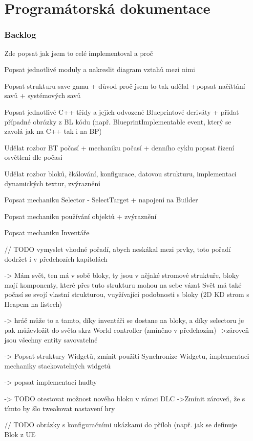 
\chapter{Programátorská dokumentace}







\subsection{Backlog}

Zde popsat jak jsem to celé implementoval a proč

Popsat jednotlivé moduly a nakreslit diagram vztahů mezi nimi

Popsat strukturu save gamu + důvod proč jsem to tak udělal
+popsat načíttání savů + systémových savů


Popsat jednotlivé C++ třídy a jejich odvozené Blueprintové deriváty + přidat případné obrázky z BL kódu (např. BlueprintImplementable event, který se zavolá jak na C++ tak i na BP) 

Udělat rozbor BT počasí + mechaniku počasí + denního cyklu
popsat řízení osvětlení dle počasí

Udělat rozbor bloků, škálování, konfigurace, datovou strukturu, implementaci dynamických textur, zvýraznění

Popsat mechaniku Selector - SelectTarget + napojení na Builder

Popsat mechaniku používání objektů + zvýraznění

Popsat mechaniku Inventáře

// TODO vymyslet vhodné pořadí, abych neskákal mezi prvky, toto pořadí dodržet i v předchozích kapitolách

-> Mám svět, ten má v sobě bloky, ty jsou v nějaké stromové struktuře, bloky mají komponenty, které přes tuto strukturu mohou na sebe vázat
Svět má také počasí se svojí vlastní strukturou, vuyžívající podobnosti s bloky (2D KD strom s Heapem na listech)

-> hráč může to a tamto, díky inventáři se dostane na bloky, a díky selectoru je pak můževložit do světa skrz World controller (zmíněno v předchozím)
->zároveň jsou všechny entity savovatelné 


-> Popsat struktury Widgetů, zmínit použití Synchronize Widgetu, implementaci mechaniky stackovatelných widgetů

-> popsat implementaci hudby

-> TODO otestovat možnost nového bloku v rámci DLC
->Zmínit zároveň, že s tímto by šlo tweakovat nastavení hry



// TODO obrázky s konfiguračními ukázkami do příloh (např. jak se definuje Blok z UE


